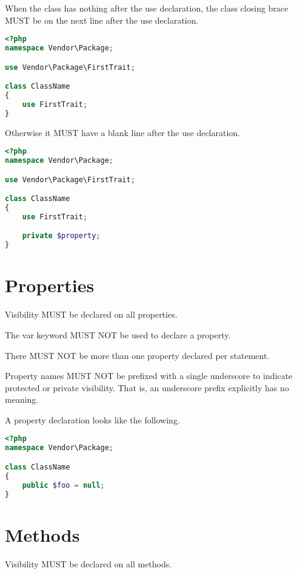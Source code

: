 When the class has nothing after the use declaration, the class closing brace MUST be on the next line after the use declaration.





\begin{lstlisting}[language=PHP]
<?php
namespace Vendor\Package;

use Vendor\Package\FirstTrait;

class ClassName
{
    use FirstTrait;
}
\end{lstlisting}


Otherwise it MUST have a blank line after the use declaration.



\begin{lstlisting}[language=PHP]
<?php
namespace Vendor\Package;

use Vendor\Package\FirstTrait;

class ClassName
{
    use FirstTrait;

    private $property;
}
\end{lstlisting}


\section{Properties}

Visibility MUST be declared on all properties.

The var keyword MUST NOT be used to declare a property.

There MUST NOT be more than one property declared per statement.

Property names MUST NOT be prefixed with a single underscore to indicate protected or private visibility. That is, an underscore prefix explicitly has no meaning.

A property declaration looks like the following.


\begin{lstlisting}[language=PHP]
<?php
namespace Vendor\Package;

class ClassName
{
    public $foo = null;
}
\end{lstlisting}



\section{Methods}

Visibility MUST be declared on all methods.


